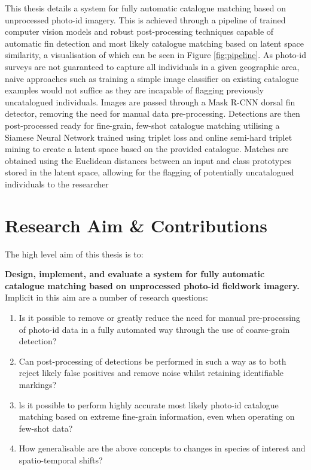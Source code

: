 This thesis details a system for fully automatic catalogue matching based on unprocessed photo-id imagery. This is achieved through a pipeline of trained computer vision models and robust post-processing techniques capable of automatic fin detection and most likely catalogue matching based on latent space similarity, a visualisation of which can be seen in Figure \ref{fig:pipeline}. As photo-id surveys are not guaranteed to capture all individuals in a given geographic area, naive approaches such as training a simple image classifier on existing catalogue examples would not suffice as they are incapable of flagging previously uncatalogued individuals. Images are passed through a Mask R-CNN \cite{he_mask_2017} dorsal fin detector, removing the need for manual data pre-processing. Detections are then post-processed ready for fine-grain, few-shot catalogue matching utilising a Siamese Neural Network trained using triplet loss \cite{schroff_facenet_2015} and online semi-hard triplet mining to create a latent space based on the provided catalogue. Matches are obtained using the Euclidean distances between an input and class prototypes stored in the latent space, allowing for the flagging of potentially uncatalogued individuals to the researcher

\section{Research Aim \& Contributions}\label{ch:intro,sec:AimsAndContributions}

The high level aim of this thesis is to:

\begin{flushleft}
	\textbf{Design, implement, and evaluate a system for fully automatic catalogue matching based on unprocessed photo-id fieldwork imagery.}
	\bigbreak\noindent Implicit in this aim are a number of research questions:
\end{flushleft}

\begin{enumerate}
	\item Is it possible to remove or greatly reduce the need for manual pre-processing of photo-id data in a fully automated way through the use of coarse-grain detection?
	\item Can post-processing of detections be performed in such a way as to both reject likely false positives and remove noise whilst retaining identifiable markings?
	\item ls it possible to perform highly accurate most likely photo-id catalogue matching based on extreme fine-grain information, even when operating on few-shot data?
	\item How generalisable are the above concepts to changes in species of interest and spatio-temporal shifts?
\end{enumerate}

